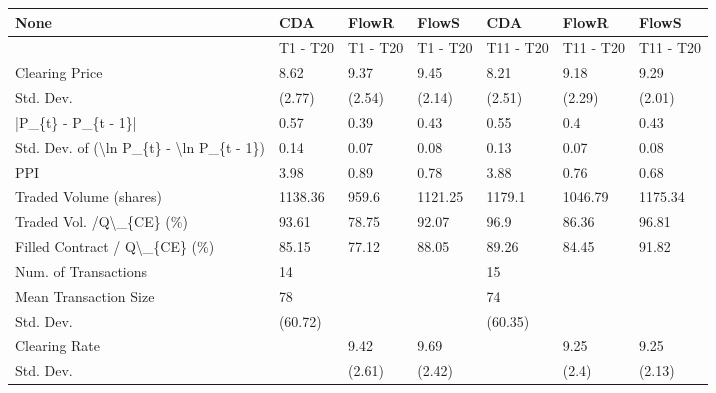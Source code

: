 \begin{tabular}{lllllll}
\hline
 None                                                      & CDA      & FlowR    & FlowS    & CDA       & FlowR     & FlowS     \\
\hline
                                                           & T1 - T20 & T1 - T20 & T1 - T20 & T11 - T20 & T11 - T20 & T11 - T20 \\
 Clearing Price                                            & 8.62     & 9.37     & 9.45     & 8.21      & 9.18      & 9.29      \\
 Std. Dev.                                                 & (2.77)   & (2.54)   & (2.14)   & (2.51)    & (2.29)    & (2.01)    \\
 |P\_\{t\} - P\_\{t - 1\}|                                       & 0.57     & 0.39     & 0.43     & 0.55      & 0.4       & 0.43      \\
 Std. Dev. of (\textbackslash{}ln P\_\{t\} - \textbackslash{}ln P\_\{t - 1\})                  & 0.14     & 0.07     & 0.08     & 0.13      & 0.07      & 0.08      \\
 PPI                                                       & 3.98     & 0.89     & 0.78     & 3.88      & 0.76      & 0.68      \\
 Traded Volume (shares)                                    & 1138.36  & 959.6    & 1121.25  & 1179.1    & 1046.79   & 1175.34   \\
 Traded Vol. /Q\textbackslash{}\_\{CE\} (\%)                                  & 93.61    & 78.75    & 92.07    & 96.9      & 86.36     & 96.81     \\
 Filled Contract / Q\textbackslash{}\_\{CE\} (\%)                             & 85.15    & 77.12    & 88.05    & 89.26     & 84.45     & 91.82     \\
 Num. of Transactions                                      & 14       &          &          & 15        &           &           \\
 Mean Transaction Size                                     & 78       &          &          & 74        &           &           \\
 Std. Dev.                                                 & (60.72)  &          &          & (60.35)   &           &           \\
 Clearing Rate                                             &          & 9.42     & 9.69     &           & 9.25      & 9.25      \\
 Std. Dev.                                                 &          & (2.61)   & (2.42)   &           & (2.4)     & (2.13)    \\

\end{tabular}
